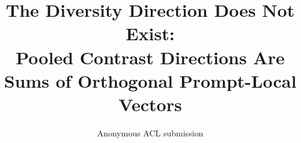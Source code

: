 \documentclass[11pt]{article}
\title{The Diversity Direction Does Not Exist:\\
Pooled Contrast Directions Are Sums of Orthogonal Prompt-Local Vectors}
\author{Anonymous ACL submission}
\begin{document}
\maketitle

\begin{abstract}

\end{abstract}














\appendix

\end{document}
